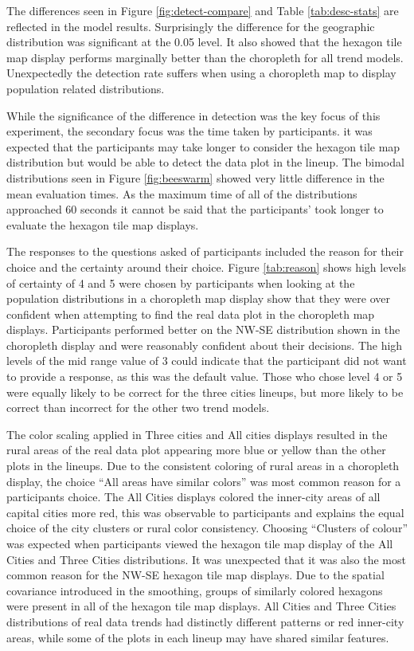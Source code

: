 \documentclass{monashthesis}
\begin{document}
The differences seen in Figure \ref{fig:detect-compare} and Table \ref{tab:desc-stats} are reflected in the model results. Surprisingly the difference for the geographic distribution was significant at the 0.05 level. It also showed that the hexagon tile map display performs marginally better than the choropleth for all trend models. Unexpectedly the detection rate suffers when using a choropleth map to display population related distributions.

While the significance of the difference in detection was the key focus of this experiment, the secondary focus was the time taken by participants. it was expected that the participants may take longer to consider the hexagon tile map distribution but would be able to detect the data plot in the lineup.
The bimodal distributions seen in Figure \ref{fig:beeswarm} showed very little difference in the mean evaluation times. As the maximum time of all of the distributions approached 60 seconds it cannot be said that the participants' took longer to evaluate the hexagon tile map displays.

The responses to the questions asked of participants included the reason for their choice and the certainty around their choice.
Figure \ref{tab:reason} shows high levels of certainty of 4 and 5 were chosen by participants when looking at the population distributions in a choropleth map display show that they were over confident when attempting to find the real data plot in the choropleth map displays. Participants performed better on the NW-SE distribution shown in the choropleth display and were reasonably confident about their decisions.
The high levels of the mid range value of 3 could indicate that the participant did not want to provide a response, as this was the default value. Those who chose level 4 or 5 were equally likely to be correct for the three cities lineups, but more likely to be correct than incorrect for the other two trend models.

The color scaling applied in Three cities and All cities displays resulted in the rural areas of the real data plot appearing more blue or yellow than the other plots in the lineups.
Due to the consistent coloring of rural areas in a choropleth display, the choice ``All areas have similar colors'' was most common reason for a participants choice. The All Cities displays colored the inner-city areas of all capital cities more red, this was observable to participants and explains the equal choice of the city clusters or rural color consistency.
Choosing ``Clusters of colour'' was expected when participants viewed the hexagon tile map display of the All Cities and Three Cities distributions. It was unexpected that it was also the most common reason for the NW-SE hexagon tile map displays.
Due to the spatial covariance introduced in the smoothing, groups of similarly colored hexagons were present in all of the hexagon tile map displays. All Cities and Three Cities distributions of real data trends had distinctly different patterns or red inner-city areas, while some of the plots in each lineup may have shared similar features.
\end{document}
